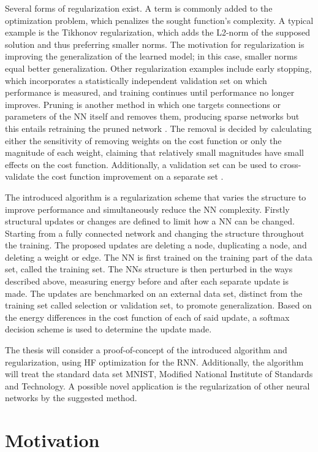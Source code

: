 Several forms of regularization exist. A term is commonly added to the optimization problem, which penalizes the sought function's complexity. A typical example is the Tikhonov regularization, which adds the L2-norm of the supposed solution and thus preferring smaller norms. The motivation for regularization is improving the generalization of the learned model; in this case, smaller norms equal better generalization. Other regularization examples include early stopping, which incorporates a statistically independent validation set on which performance is measured, and training continues until performance no longer improves. Pruning is another method in which one targets connections or parameters of the NN itself and removes them, producing sparse networks but this entails retraining the pruned network \cite{Yann}. The removal is decided by calculating either the sensitivity of removing weights on the cost function or only the magnitude of each weight, claiming that relatively small magnitudes have small effects on the cost function. Additionally, a validation set can be used to cross-validate the cost function improvement on a separate set \cite{prunings}. 

The introduced algorithm is a regularization scheme that varies the structure to improve performance and simultaneously reduce the NN complexity. Firstly structural updates or changes are defined to limit how a NN can be changed. Starting from a fully connected network and changing the structure throughout the training. The proposed updates are deleting a node, duplicating a node, and deleting a weight or edge. The NN is first trained on the training part of the data set, called the training set. The NNs structure is then perturbed in the ways described above, measuring energy before and after each separate update is made. The updates are benchmarked on an external data set, distinct from the training set called selection or validation set, to promote generalization. Based on the energy differences in the cost function of each of said update, a softmax decision scheme is used to determine the update made. 

The thesis will consider a proof-of-concept of the introduced algorithm and regularization, using HF optimization for the RNN. Additionally, the algorithm will treat the standard data set MNIST, Modified National Institute of Standards and Technology\cite{mnist}. A possible novel application is the regularization of other neural networks by the suggested method.

\section{Motivation}

